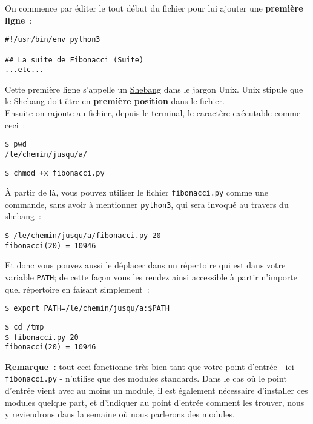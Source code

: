     On commence par éditer le tout début du fichier pour lui ajouter une
\textbf{première ligne}~:

    \begin{verbatim}
#!/usr/bin/env python3

## La suite de Fibonacci (Suite)
...etc...
\end{verbatim}

    Cette première ligne s'appelle un
\href{http://en.wikipedia.org/wiki/Shebang_\%28Unix\%29}{Shebang} dans
le jargon Unix. Unix stipule que le Shebang doit être en
\textbf{première position} dans le fichier.\\

    Ensuite on rajoute au fichier, depuis le terminal, le caractère
exécutable comme ceci~:

    \begin{verbatim}
$ pwd
/le/chemin/jusqu/a/
\end{verbatim}

    \begin{verbatim}
$ chmod +x fibonacci.py
\end{verbatim}

    À partir de là, vous pouvez utiliser le fichier \texttt{fibonacci.py}
comme une commande, sans avoir à mentionner \texttt{python3}, qui sera
invoqué au travers du shebang~:

    \begin{verbatim}
$ /le/chemin/jusqu/a/fibonacci.py 20
fibonacci(20) = 10946
\end{verbatim}

    Et donc vous pouvez aussi le déplacer dans un répertoire qui est dans
votre variable \texttt{PATH}; de cette façon vous les rendez ainsi
accessible à partir n'importe quel répertoire en faisant simplement~:

    \begin{verbatim}
$ export PATH=/le/chemin/jusqu/a:$PATH
\end{verbatim}

    \begin{verbatim}
$ cd /tmp
$ fibonacci.py 20
fibonacci(20) = 10946
\end{verbatim}

    \textbf{Remarque~:} tout ceci fonctionne très bien tant que votre point
d'entrée - ici \texttt{fibonacci.py} - n'utilise que des modules
standards. Dans le cas où le point d'entrée vient avec au moins un
module, il est également nécessaire d'installer ces modules quelque
part, et d'indiquer au point d'entrée comment les trouver, nous y
reviendrons dans la semaine où nous parlerons des modules.